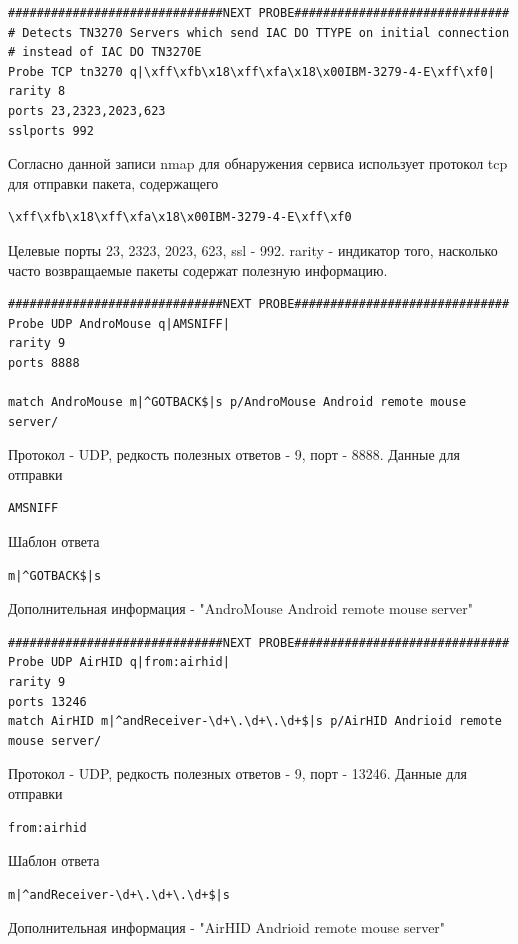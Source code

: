\documentclass[10pt,a4paper]{article}
\begin{document}
\begin{verbatim}
##############################NEXT PROBE##############################
# Detects TN3270 Servers which send IAC DO TTYPE on initial connection
# instead of IAC DO TN3270E
Probe TCP tn3270 q|\xff\xfb\x18\xff\xfa\x18\x00IBM-3279-4-E\xff\xf0|
rarity 8
ports 23,2323,2023,623
sslports 992
\end{verbatim}

Согласно данной записи nmap для обнаружения сервиса использует протокол tcp для отправки пакета, содержащего \begin{verbatim}\xff\xfb\x18\xff\xfa\x18\x00IBM-3279-4-E\xff\xf0\end{verbatim}
Целевые порты 23, 2323, 2023, 623, ssl - 992. rarity - индикатор того, насколько часто возвращаемые пакеты содержат полезную информацию.

\begin{verbatim}
##############################NEXT PROBE##############################
Probe UDP AndroMouse q|AMSNIFF|
rarity 9
ports 8888

match AndroMouse m|^GOTBACK$|s p/AndroMouse Android remote mouse server/
\end{verbatim}

Протокол - UDP, редкость полезных ответов - 9, порт - 8888.
Данные для отправки \begin{verbatim}AMSNIFF\end{verbatim}
Шаблон ответа \begin{verbatim}m|^GOTBACK$|s\end{verbatim}
Дополнительная информация - "AndroMouse Android remote mouse server"

\begin{verbatim}
##############################NEXT PROBE##############################
Probe UDP AirHID q|from:airhid|
rarity 9
ports 13246
match AirHID m|^andReceiver-\d+\.\d+\.\d+$|s p/AirHID Andrioid remote mouse server/
\end{verbatim}

Протокол - UDP, редкость полезных ответов - 9, порт - 13246.
Данные для отправки \begin{verbatim}from:airhid\end{verbatim}
Шаблон ответа \begin{verbatim}m|^andReceiver-\d+\.\d+\.\d+$|s\end{verbatim}
Дополнительная информация - "AirHID Andrioid remote mouse server"
\end{document}
